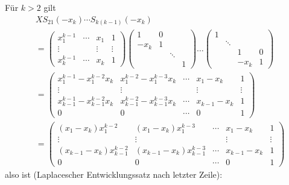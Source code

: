 \begin{Definition}
 		Für $ k>2 $ gilt
 		\begin{align*}
 			&XS_{21}(-x_k)\cdots S_{k(k-1)}(-x_k) \\
 			&=
 			\begin{pmatrix}
 			x_1^{k-1} &\cdots & x_1 & 1\\
 			\vdots & & \vdots & \vdots\\
 			x_k^{k-1} & \cdots & x_k & 1
 			\end{pmatrix}
 			\begin{pmatrix}
 			1 & 0 &   & \\
 			-x_k & 1 &  & \\
 			&  & \ddots & \\
 			& & & 1
 			\end{pmatrix}
 			\dots
 			\begin{pmatrix}
 			1 &  &   & \\
 			& \ddots&  &\\
 			&   &1 & 0 \\
 			& & -x_k & 1
 			\end{pmatrix}
 			\\
 			&=
 			\begin{pmatrix}
 			x_1^{k-1}-x_1^{k-2}x_k         & x_1^{k-2}-x_1^{k-3}x_k         & \cdots & x_1-x_k     & 1      \\
 			\vdots                         & \vdots                         &        & \vdots      & \vdots \\
 			x_{k-1}^{k-1}-x_{k-1}^{k-2}x_k & x_{k-1}^{k-2}-x_{k-1}^{k-3}x_k & \cdots & x_{k-1}-x_k & 1      \\
 			0                              & 0                              & \cdots & 0           & 1
 			\end{pmatrix}
 			\\
 			&=
 			\begin{pmatrix}
 			(x_1-x_k)x_1^{k-2}             & (x_1-x_k)x_1^{k-3}             & \cdots & x_1-x_k     & 1      \\
 			\vdots                         & \vdots                         &        & \vdots      & \vdots \\
 			(x_{k-1}-x_k)x_{k-1}^{k-2}     & (x_{k-1}-x_k)x_{k-1}^{k-3}     & \cdots & x_{k-1}-x_k & 1      \\
 			0                              & 0                              & \cdots & 0           & 1
 			\end{pmatrix}
 		\end{align*}
 		also ist (Laplacescher Entwicklungssatz nach letzter Zeile):

\end{Definition}
